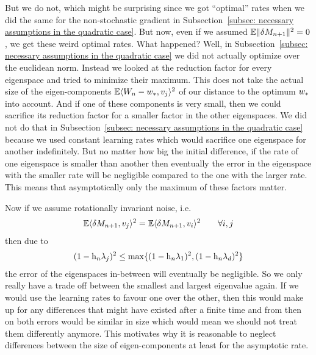 But we do not, which might be surprising since we got ``optimal'' rates when
we did the same for the non-stochastic gradient in Subsection~\ref{subsec:
necessary assumptions in the quadratic case}. But now, even if we assumed
\(\mathbb{E}\|\delta M_{n+1}\|^2=0\), we get these weird optimal rates. What happened?
Well, in Subsection~\ref{subsec: necessary assumptions in the quadratic case}
we did not actually optimize over the euclidean norm. Instead we looked at the
reduction factor for every eigenspace and tried to minimize their maximum.
This does not take the actual size of the eigen-components
\(\mathbb{E}\langle W_n-w_*, v_j\rangle^2\) of our distance to the optimum
\(w_*\) into account. And if one of these components is very small, then
we could sacrifice its reduction factor for a smaller factor in the other
eigenspaces. We did not do that in Subsection~\ref{subsec: necessary assumptions
in the quadratic case} because we used constant learning rates which would
sacrifice one eigenspace for another indefinitely. But no matter how big the
initial difference, if the rate of one eigenspace is smaller than another then
eventually the error in the eigenspace with the smaller rate will be
negligible compared to the one with the larger rate. This means that
asymptotically only the maximum of these factors matter.

Now if we assume rotationally invariant noise, i.e.
\begin{align*}
	\mathbb{E}\langle\delta M_{n+1},v_j\rangle^2 = \mathbb{E}\langle\delta M_{n+1}, v_i\rangle^2
	\qquad \forall i,j
\end{align*}
then due to
\begin{align*}
	(1-\text{h}_n \lambda_j)^2
	\le \max \{ (1-\text{h}_n\lambda_1)^2, (1-\text{h}_n\lambda_d)^2 \}
\end{align*}
the error of the eigenspaces in-between will eventually be negligible. So we 
only really have a trade off between the smallest and largest eigenvalue again.
If we would use the learning rates to favour one over the other, then this would
make up for any differences that might have existed after a finite time and
from then on both errors would be similar in size which would mean we should
not treat them differently anymore. This motivates why it is reasonable to
neglect differences between the size of eigen-components at least for the
asymptotic rate.

